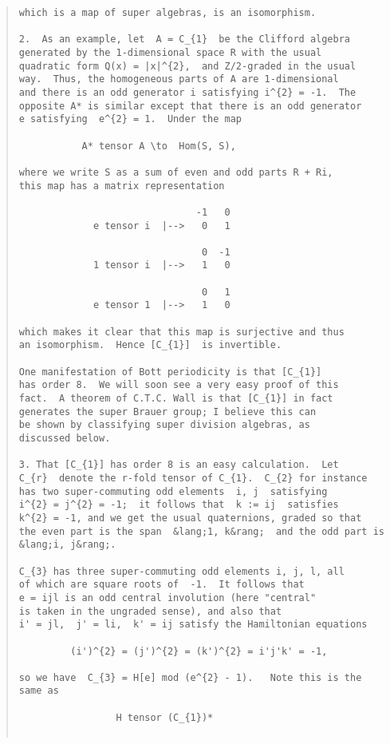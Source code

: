 \begin{quote}
\begin{verbatim}
which is a map of super algebras, is an isomorphism. 

2.  As an example, let  A = C_{1}  be the Clifford algebra 
generated by the 1-dimensional space R with the usual 
quadratic form Q(x) = |x|^{2},  and Z/2-graded in the usual 
way.  Thus, the homogeneous parts of A are 1-dimensional 
and there is an odd generator i satisfying i^{2} = -1.  The 
opposite A* is similar except that there is an odd generator 
e satisfying  e^{2} = 1.  Under the map 

           A* tensor A \to  Hom(S, S), 

where we write S as a sum of even and odd parts R + Ri, 
this map has a matrix representation 

                               -1   0
             e tensor i  |-->   0   1

                                0  -1 
             1 tensor i  |-->   1   0

                                0   1
             e tensor 1  |-->   1   0

which makes it clear that this map is surjective and thus 
an isomorphism.  Hence [C_{1}]  is invertible. 

One manifestation of Bott periodicity is that [C_{1}] 
has order 8.  We will soon see a very easy proof of this 
fact.  A theorem of C.T.C. Wall is that [C_{1}] in fact 
generates the super Brauer group; I believe this can 
be shown by classifying super division algebras, as 
discussed below. 

3. That [C_{1}] has order 8 is an easy calculation.  Let 
C_{r}  denote the r-fold tensor of C_{1}.  C_{2} for instance 
has two super-commuting odd elements  i, j  satisfying 
i^{2} = j^{2} = -1;  it follows that  k := ij  satisfies  
k^{2} = -1, and we get the usual quaternions, graded so that 
the even part is the span  &lang;1, k&rang;  and the odd part is &lang;i, j&rang;. 

C_{3} has three super-commuting odd elements i, j, l, all 
of which are square roots of  -1.  It follows that 
e = ijl is an odd central involution (here "central" 
is taken in the ungraded sense), and also that  
i' = jl,  j' = li,  k' = ij satisfy the Hamiltonian equations 

         (i')^{2} = (j')^{2} = (k')^{2} = i'j'k' = -1, 

so we have  C_{3} = H[e] mod (e^{2} - 1).   Note this is the 
same as 

                 H tensor (C_{1})*


\end{verbatim}
\end{quote}
